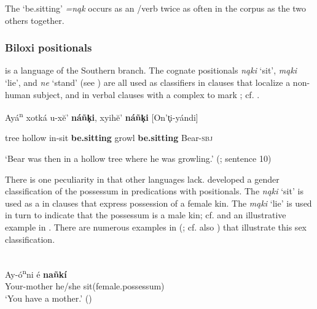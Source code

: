 \documentclass[output=paper]{langsci/langscibook}
\begin{document}
The `be.sitting'  \textit{=nąk} occurs as an /verb twice as often in the corpus as the two others together.

\subsubsection{Biloxi positionals}\label{sec:helmbrecht:2.2.4}

 is a  language of the Southern branch. The cognate  positionals \textit{nąki} `sit', \textit{mąki} `lie', and \textit{ne} `stand' (see ) are all used as classifiers in  clauses that localize a non-human subject, and in verbal clauses with a complex  to mark ; cf. .

\ea \label{ex:helmbrecht:9}

{Ayá}{\textsuperscript{n}}{ xotká    u-x}{ĕ}{'} \textbf{{ná}}\textbf{{ñ}}\textbf{{k}}\textbf{{̟}}\textbf{{i}}{,       xyih}{ĕ}{'} \textbf{{ná}}\textbf{{ñ}}\textbf{{k}}\textbf{{̟}}\textbf{{i}}{} [{On't}{̟}{i-yándi}]

  tree   hollow in-sit  \textbf{be.sitting}  growl   \textbf{be.sitting}  Bear-\textsc{sbj}

 `Bear was then in a hollow tree where he was growling.' 
 (\citealt[16]{Dorsey1912}; sentence 10)
\z 

There is one peculiarity in  that other  languages lack.  developed a gender classification of the possessum in  predications with positionals. The  \textit{nąki} `sit' is used as a  in  clauses that express possession of a female kin. The  \textit{mąki} `lie' is used in turn to indicate that the possessum is a male kin; cf.  and an illustrative example in . There are numerous examples in \citeauthor{Dorsey1912} (\citeyear[130]{Dorsey1912}; cf. also \citealt{Kaufmann2011}) that illustrate this sex classification.

\ea \label{ex:helmbrecht:10}
 \\
\gll   Ay-ó\textsuperscript{n}ni       é \textbf{nañkí}\\
  Your-mother  he/she   sit(female.possessum)\\
\glt `You have a mother.' (\citealt[130]{Dorsey1912})
\z
\end{document}
